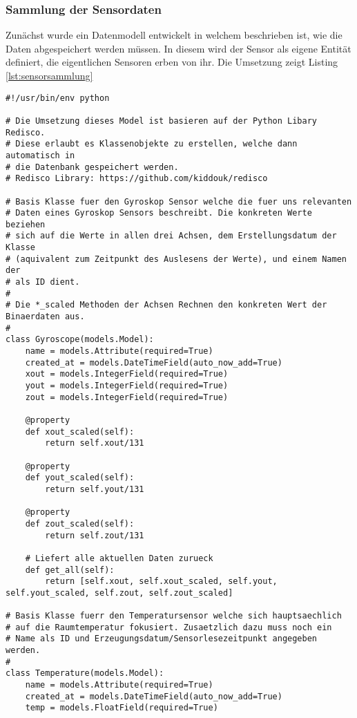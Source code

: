 \subsubsection{Sammlung der Sensordaten}

Zunächst wurde ein Datenmodell entwickelt in welchem beschrieben ist, wie die Daten abgespeichert werden müssen. In diesem wird der Sensor als eigene Entität definiert, die eigentlichen Sensoren erben von ihr. Die Umsetzung zeigt Listing \ref{lst:sensorsammlung}

\begin{lstlisting}[style=pythonstyle, caption=Sensorenmodell, label={lst:sensorsammlung}]
#!/usr/bin/env python

# Die Umsetzung dieses Model ist basieren auf der Python Libary Redisco.
# Diese erlaubt es Klassenobjekte zu erstellen, welche dann automatisch in 
# die Datenbank gespeichert werden.
# Redisco Library: https://github.com/kiddouk/redisco

# Basis Klasse fuer den Gyroskop Sensor welche die fuer uns relevanten 
# Daten eines Gyroskop Sensors beschreibt. Die konkreten Werte beziehen
# sich auf die Werte in allen drei Achsen, dem Erstellungsdatum der Klasse 
# (aquivalent zum Zeitpunkt des Auslesens der Werte), und einem Namen der 
# als ID dient.
# 
# Die *_scaled Methoden der Achsen Rechnen den konkreten Wert der Binaerdaten aus.
# 
class Gyroscope(models.Model):
    name = models.Attribute(required=True)
    created_at = models.DateTimeField(auto_now_add=True)
    xout = models.IntegerField(required=True)
    yout = models.IntegerField(required=True)
    zout = models.IntegerField(required=True)

    @property
    def xout_scaled(self):
        return self.xout/131

    @property
    def yout_scaled(self):
        return self.yout/131

    @property
    def zout_scaled(self):
        return self.zout/131

    # Liefert alle aktuellen Daten zurueck
    def get_all(self):
        return [self.xout, self.xout_scaled, self.yout, self.yout_scaled, self.zout, self.zout_scaled]

# Basis Klasse fuerr den Temperatursensor welche sich hauptsaechlich
# auf die Raumtemperatur fokusiert. Zusaetzlich dazu muss noch ein 
# Name als ID und Erzeugungsdatum/Sensorlesezeitpunkt angegeben werden.
# 
class Temperature(models.Model):
    name = models.Attribute(required=True)
    created_at = models.DateTimeField(auto_now_add=True)
    temp = models.FloatField(required=True)



\end{lstlisting}

